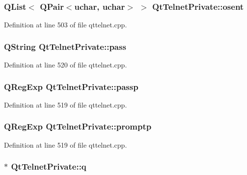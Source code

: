 \hypertarget{classQtTelnetPrivate_a8c36d306aa1d9e15183f339ec9bc5862}{
\subsubsection[{osent}]{\setlength{\rightskip}{0pt plus 5cm}QList$<$ QPair$<$uchar, uchar$>$ $>$ {\bf QtTelnetPrivate::osent}}}
\label{classQtTelnetPrivate_a8c36d306aa1d9e15183f339ec9bc5862}


Definition at line 503 of file qttelnet.cpp.

\hypertarget{classQtTelnetPrivate_ae4bbc9a28524e8e55071fdd9587303bc}{
\subsubsection[{pass}]{\setlength{\rightskip}{0pt plus 5cm}QString {\bf QtTelnetPrivate::pass}}}
\label{classQtTelnetPrivate_ae4bbc9a28524e8e55071fdd9587303bc}


Definition at line 520 of file qttelnet.cpp.

\hypertarget{classQtTelnetPrivate_ab162800a573c3b01b264a76b5e311f4b}{
\subsubsection[{passp}]{\setlength{\rightskip}{0pt plus 5cm}QRegExp {\bf QtTelnetPrivate::passp}}}
\label{classQtTelnetPrivate_ab162800a573c3b01b264a76b5e311f4b}


Definition at line 519 of file qttelnet.cpp.

\hypertarget{classQtTelnetPrivate_a2f2b0fe1bdb6bb84d9f5db5f38af0062}{
\subsubsection[{promptp}]{\setlength{\rightskip}{0pt plus 5cm}QRegExp {\bf QtTelnetPrivate::promptp}}}
\label{classQtTelnetPrivate_a2f2b0fe1bdb6bb84d9f5db5f38af0062}


Definition at line 519 of file qttelnet.cpp.

\hypertarget{classQtTelnetPrivate_accc5387fdb43bf070a18bcf975134406}{
\subsubsection[{q}]{$\ast$ {\bf QtTelnetPrivate::q}}}
\label{classQtTelnetPrivate_accc5387fdb43bf070a18bcf975134406}


